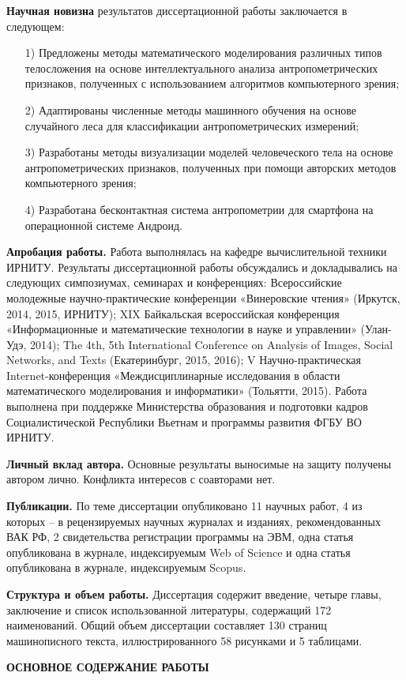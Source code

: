 \textbf{Научная новизна} результатов диссертационной работы заключается в следующем:

\begin{enumerate}
	\item[1)] Предложены методы математического моделирования различных типов телосложения на основе интеллектуального анализа антропометрических признаков, полученных с использованием алгоритмов компьютерного зрения;
	\item[2)]	Адаптированы численные методы машинного обучения на основе случайного леса для классификации антропометрических измерений;
	\item[3)] Разработаны методы визуализации моделей человеческого тела на основе антропометрических признаков, полученных при помощи авторских методов компьютерного зрения;
	\item[4)] Разработана бесконтактная система антропометрии для смартфона на операционной системе Андроид. 
\end{enumerate}

\textbf{Апробация работы.} Работа выполнялась на кафедре вычислительной техники ИРНИТУ. Результаты диссертационной работы обсуждались и докладывались на следующих симпозиумах, семинарах и конференциях: Всероссийские молодежные научно-практические конференции «Винеровские чтения» (Иркутск, 2014, 2015, ИРНИТУ); XIX Байкальская всероссийская конференция «Информационные и математические технологии в науке и управлении» (Улан-Удэ, 2014); The 4th, 5th International Conference on Analysis of Images, Social Networks, and Texts (Екатеринбург, 2015, 2016); V Научно-практическая Internet-конференция «Междисциплинарные исследования в области математического моделирования и информатики» (Тольятти, 2015). Работа выполнена при поддержке Министерства образования и подготовки кадров Социалистической Республики Вьетнам и программы развития ФГБУ ВО ИРНИТУ.

\textbf{Личный вклад автора.} Основные результаты выносимые на защиту получены автором лично. Конфликта интересов с соавторами нет.

\textbf{Публикации.} По теме диссертации опубликовано 11 научных работ, 4 из которых – в рецензируемых научных журналах и изданиях, рекомендованных ВАК РФ, 2 свидетельства регистрации программы на ЭВМ, одна статья опубликована в журнале, индексируемым Web of Science и одна статья опубликована в журнале, индексируемым Scopus.

\textbf{Структура и объем работы.} Диссертация содержит введение, четыре главы, заключение и список использованной литературы, содержащий 172 наименований. Общий объем диссертации составляет 130 страниц машинописного текста, иллюстрированного 58 рисунками и 5 таблицами.
\begin{center}
\textbf{ОСНОВНОЕ СОДЕРЖАНИЕ РАБОТЫ}
\end{center}


